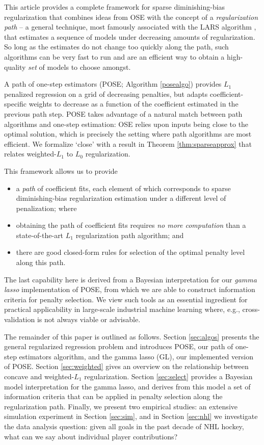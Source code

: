 \documentclass[12pt]{article}
\begin{document}
This article provides a complete framework for sparse diminishing-bias
regularization that combines ideas from OSE with the concept of a
\textit{regularization path} -- a general technique, most famously associated
with the LARS algorithm \citep{efron_least_2004}, that estimates a sequence of
models under decreasing amounts of regularization.  So long as the estimates do not change too quickly along the path, such  algorithms can be very fast to run and are an efficient way to obtain a high-quality \textit{set} of models to choose amongst.  

A path of one-step estimators (POSE; Algorithm \ref{posealgo})
provides $L_1$ penalized regression  on a grid of decreasing
penalties, but adapts coefficient-specific weights to decrease as a function
of the coefficient estimated in the previous path step.  POSE takes advantage
of a natural match between path algorithms and one-step estimation: OSE
relies upon inputs being close to the optimal solution, which is precisely the
setting where path algorithms are most efficient.  We formalize `close' with a  result in Theorem \ref{thm:sparseapprox} that relates weighted-$L_1$ to $L_0$ regularization.

This framework allows us to provide 
\begin{itemize}
\item a {\it path} of coefficient fits, each element of which corresponds to sparse diminishing-bias regularization estimation under a different level of penalization; where
\item obtaining the path of coefficient fits requires {\it no more computation} than  a state-of-the-art $L_1$ regularization path algorithm; and
\item there are good closed-form rules for selection of the optimal penalty level along this path.
\end{itemize}
The last capability here is derived from a Bayesian interpretation for our \textit{gamma lasso} implementation of POSE, from which we are able to construct information criteria for penalty selection.
We view such tools as an essential ingredient for practical applicability in large-scale industrial machine learning where, e.g., cross-validation is not always viable or advisable.


The remainder of this paper is outlined as follows.  Section \ref{sec:algos}
presents the general regularized regression problem and introduces POSE, our
path of one-step estimators algorithm, and the gamma lasso (GL), our
implemented version of POSE.  Section \ref{sec:weighted} gives an overview on
the relationship between concave and weighted-$L_1$ regularization. Section \ref{sec:select} provides a Bayesian model interpretation
for the gamma lasso, and derives from this model a set of information criteria
that can be applied in penalty selection along the regularization path.
Finally, we present two empirical studies:
an extensive  simulation experiment in Section \ref{sec:sim}, and in Section \ref{sec:nhl} we investigate the data analysis question: given all goals in the past decade of NHL hockey, what can we say about individual player contributions? 
\end{document}
